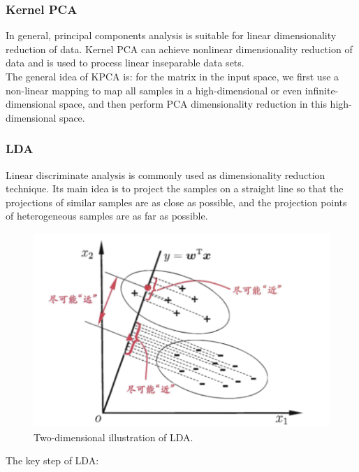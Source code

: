 \documentclass{article}
\begin{document}
\subsubsection{Kernel PCA}
\indent In general, principal components analysis is suitable for linear dimensionality reduction of data. Kernel PCA can achieve nonlinear dimensionality reduction of data and is used to process linear inseparable data sets.\\
\indent The general idea of KPCA is: for the matrix in the input space, we first use a non-linear mapping to map all samples in a high-dimensional or even infinite-dimensional space, and then perform PCA dimensionality reduction in this high-dimensional space.
\subsubsection{LDA}
\indent Linear discriminate analysis is commonly used as dimensionality reduction technique. Its main idea is to project the samples on a straight line so that the projections of similar samples are as close as possible, and the projection points of heterogeneous samples are as far as possible. 
	\begin{figure}[htbp]
		\centering
		\includegraphics[scale=0.3]{figures/LDA.png}
		\caption{Two-dimensional illustration of LDA.}
		\label{fig:LDA}
	\end{figure}\cite{zhihuazhou2016ml}\par
\indent The key step of LDA:
\end{document}
